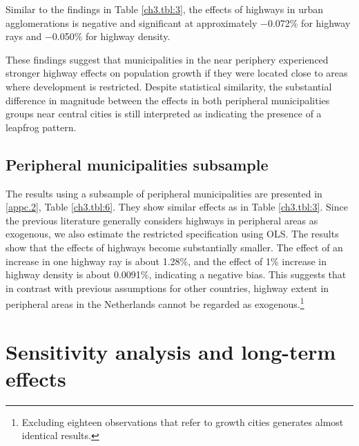 \documentclass[a4paper,authoryear,review]{elsarticle}  	%
\begin{document}
	
	
	Similar to the findings in Table \ref{ch3.tbl:3}, the effects of highways in urban agglomerations is negative and significant at approximately $-$0.072\% for highway rays and $-$0.050\% for highway density.
	
	These findings suggest that municipalities in the near periphery experienced stronger highway effects on population growth if they were located close to areas where development is restricted. Despite statistical similarity, the substantial difference in magnitude between the effects in both peripheral municipalities groups near central cities is still interpreted as indicating the presence of a leapfrog pattern. 	
	
	
\subsection{Peripheral municipalities subsample}
	The results using a subsample of peripheral municipalities are presented in \ref{appc.2}, Table \ref{ch3.tbl:6}. They show similar effects as in Table \ref{ch3.tbl:3}. 	
	Since the previous literature generally considers highways in peripheral areas as exogenous, we also estimate the restricted specification using OLS. The results show that the effects of highways become substantially smaller. The effect of an increase in one highway ray is about 1.28\%, and the effect of 1\% increase in highway density is about 0.0091\%, indicating a negative bias. This suggests that in contrast with previous assumptions for other countries, highway extent in peripheral areas in the Netherlands cannot be regarded as exogenous.\footnote{Excluding eighteen observations that refer to growth cities generates almost identical results.} 	
		
\section[Sensitivity analysis]{Sensitivity analysis and long-term effects}
\end{document}
